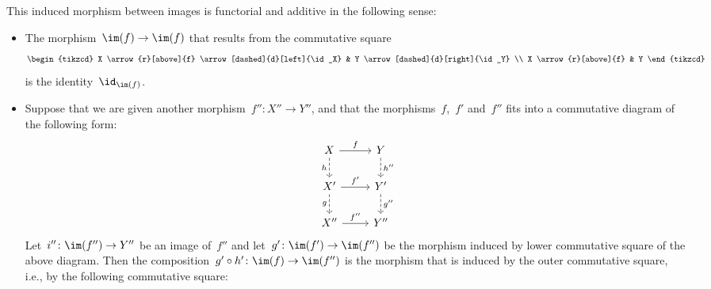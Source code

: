 \begin{remark*}
\begin{enumerate}
      This induced morphism between images is functorial and additive in the following sense:
      \begin{itemize}
        \item
          The morphism~$\im(f) \to \im(f)$ that results from the commutative square
          \[
            \begin{tikzcd}
                X
                \arrow{r}[above]{f}
                \arrow[dashed]{d}[left]{\id_X}
              & Y
                \arrow[dashed]{d}[right]{\id_Y}
              \\
                X
                \arrow{r}[above]{f}
              & Y
            \end{tikzcd}
          \]
          is the identity~$\id_{\im(f)}$.
        \item
          Suppose that we are given another morphism~$f'' \colon X'' \to Y''$, and that the morphisms~$f$,~$f'$ and~$f''$ fits into a commutative diagram of the following form:
          \[
            \begin{tikzcd}
                X
                \arrow{r}[above]{f}
                \arrow[dashed]{d}[left]{h}
              & Y
                \arrow[dashed]{d}[right]{h''}
              \\
                X'
                \arrow{r}[above]{f'}
                \arrow[dashed]{d}[left]{g}
              & Y'
                \arrow[dashed]{d}[right]{g''}
              \\
                X''
                \arrow{r}[above]{f''}
              & Y''
            \end{tikzcd}
          \]
          Let~$i'' \colon \im(f'') \to Y''$ be an image of~$f''$ and let~$g' \colon \im(f') \to \im(f'')$ be the morphism induced by lower commutative square of the above diagram.
          Then the composition~$g' \circ h' \colon \im(f) \to \im(f'')$ is the morphism that is induced by the outer commutative square, i.e., by the following commutative square:

\end{itemize}
\end{enumerate}
\end{remark*}
